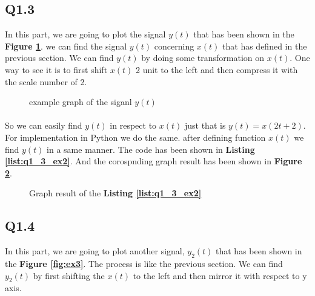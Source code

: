 \subsection{Q1.3}

In this part, we are going to plot the 
signal $y(t)$ that has been shown in the 
\textbf{Figure \ref{fig:ex2}}. we can find the signal 
$y(t)$ concerning $x(t)$ that has defined in the 
previous section. We can find $y(t)$ by doing some 
transformation on $x(t)$. One way to see it is to 
first shift $x(t)$ 2 unit to the left and then 
compress it with the scale number of 2.

\begin{figure}[H]
 \centering
{}
\caption{example graph of the siganl $y(t)$}
  \label{fig:ex2}
\end{figure}
\paragraph{}
So we can easily find $y(t)$ in respect to $x(t)$ 
just that is $y(t) = x(2t+2)$. For implementation 
in Python we do the same. after defining function 
$x(t)$ we find $y(t)$ in a same manner. The code 
has been shown in \textbf{Listing \ref{list:q1_3_ex2}}. And the 
corospnding graph result has been shown in 
\textbf{Figure \ref{fig:Q1-3-ex2}}.

\begin{figure}[H]
  \centering
  \scalebox{0.6}{}
  \caption{Graph result of the \textbf{Listing \ref{list:q1_3_ex2}}}
  \label{fig:Q1-3-ex2}
\end{figure}

\subsection{Q1.4}

In this part, we are going to plot another
signal, $y_2(t)$ that has been shown in the 
\textbf{Figure \ref{fig:ex3}}. The process is like 
the previous section. We can find $y_2(t)$ by first shifting 
the $x(t)$ to the left and then mirror it with respect 
to y axis.

